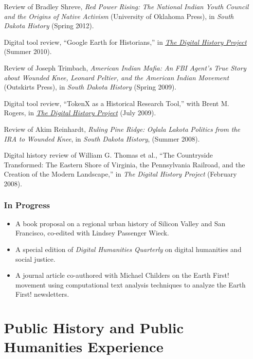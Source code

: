 Review of Bradley Shreve, \emph{Red Power Rising: The National Indian
Youth Council and the Origins of Native Activism} (University of
Oklahoma Press), in \emph{South Dakota History} (Spring 2012).

Digital tool review, ``Google Earth for Historians,'' in
\emph{\href{http://digitalhistory.unl.edu/t-reviews/geheppler.php}{The
Digital History Project}} (Summer 2010).

Review of Joseph Trimbach, \emph{American Indian Mafia: An FBI Agent's
True Story about Wounded Knee, Leonard Peltier, and the American Indian
Movement} (Outskirts Press), in \emph{South Dakota History} (Spring
2009).

Digital tool review, ``TokenX as a Historical Research Tool,'' with
Brent M. Rogers, in
\emph{\href{http://digitalhistory.unl.edu/t-reviews/tokenxhepplerrogers.php}{The
Digital History Project}} (July 2009).

Review of Akim Reinhardt, \emph{Ruling Pine Ridge: Oglala Lakota
Politics from the IRA to Wounded Knee}, in \emph{South Dakota History},
(Summer 2008).

Digital history review of William G. Thomas et al., ``The Countryside
Transformed: The Eastern Shore of Virginia, the Pennsylvania Railroad,
and the Creation of the Modern Landscape,'' in \emph{The Digital History
Project} (February 2008).

\subsubsection{In Progress}\label{in-progress}

\begin{itemize}
\tightlist
\item
  A book proposal on a regional urban history of Silicon Valley and San
  Francisco, co-edited with Lindsey Passenger Wieck.
\item
  A special edition of \emph{Digital Humanities Quarterly} on digital
  humanities and social justice.
\item
  A journal article co-authored with Michael Childers on the Earth
  First! movement using computational text analysis techniques to
  analyze the Earth First! newsletters.
\end{itemize}

\section{Public History and Public Humanities
Experience}\label{public-history-and-public-humanities-experience}

